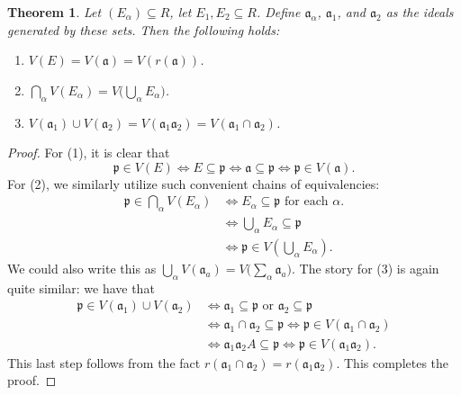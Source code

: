 \documentclass[11pt]{article}
\newtheorem{theorem}{Theorem}
\begin{document}
\begin{adjustwidth}{0.5cm}{}
  \begin{theorem}
    Let $(E_{\alpha}) \subseteq R$, let $E_{1}, E_{2} \subseteq R$. Define $\mathfrak{a}_{\alpha}$, $\mathfrak{a}_{1}$, and $\mathfrak{a}_{2}$ as the ideals generated by these sets. Then the following holds:
    \begin{enumerate}
      \item $V(E) = V(\mathfrak{a}) = V(r(\mathfrak{a}))$.
      \item $\bigcap\limits_{\alpha} V(E_{\alpha}) = V \big( \bigcup\limits_{\alpha} E_{\alpha} \big)$.
      \item $V(\mathfrak{a}_{1}) \cup V(\mathfrak{a}_{2}) = V(\mathfrak{a}_{1}\mathfrak{a}_{2}) = V(\mathfrak{a}_{1} \cap \mathfrak{a}_{2})$.
    \end{enumerate}
  \end{theorem}
  \begin{proof}
    For (1), it is clear that
    \[
      \mathfrak{p} \in V(E) \iff E \subseteq \mathfrak{p} \iff \mathfrak{a} \subseteq \mathfrak{p} \iff \mathfrak{p} \in V(\mathfrak{a}).
    \]
    For (2), we similarly utilize such convenient chains of equivalencies:
    \begin{align*}
      \mathfrak{p} \in \bigcap\limits_{\alpha} V(E_{\alpha}) & \iff E_{\alpha} \subseteq \mathfrak{p} \text{ for each } \alpha. \\
                                                             & \iff \bigcup\limits_{\alpha} E_{\alpha} \subseteq \mathfrak{p} \\
                                                             & \iff \mathfrak{p} \in V \left( \bigcup\limits_{\alpha} E_{\alpha} \right).
    \end{align*}
    We could also write this as $\bigcup\limits_{\alpha} V(\mathfrak{a}_{a}) = V \big( \sum\limits_{\alpha} \mathfrak{a}_{a} \big)$.
    \newpage
    The story for (3) is again quite similar: we have that
    \begin{align*}
      \mathfrak{p} \in V(\mathfrak{a}_{1}) \cup V(\mathfrak{a}_{2}) &\iff \mathfrak{a}_{1} \subseteq \mathfrak{p} \text{ or } \mathfrak{a}_{2} \subseteq \mathfrak{p} \\
                                                                                        &\iff \mathfrak{a}_{1} \cap \mathfrak{a}_{2} \subseteq \mathfrak{p} \iff \mathfrak{p} \in V(\mathfrak{a}_{1} \cap \mathfrak{a}_{2}) \\
                                                                                                                                                                                & \iff \mathfrak{a}_{1}\mathfrak{a}_{2}A \subseteq \mathfrak{p} \iff \mathfrak{p} \in V(\mathfrak{a}_{1}\mathfrak{a}_{2}).
    \end{align*}
    This last step follows from the fact $r(\mathfrak{a}_{1} \cap \mathfrak{a}_{2}) = r(\mathfrak{a}_{1}\mathfrak{a}_{2})$. This completes the proof. 
  \end{proof}
\end{adjustwidth}
\end{document}
